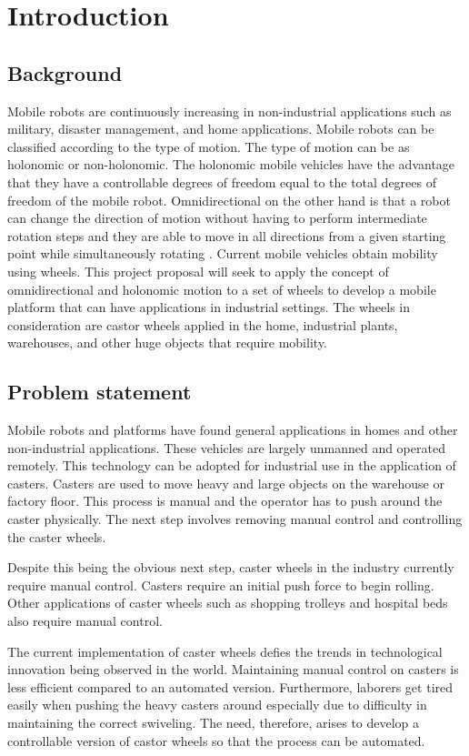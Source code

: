 \section{Introduction}
\label{sec:introduction}

\subsection{Background}

Mobile robots are continuously increasing in non-industrial applications such as military, disaster management, and home applications.
Mobile robots can be classified according to the type of motion. The type of motion can be as holonomic or non-holonomic.
The holonomic mobile vehicles have the advantage that they have a controllable degrees of freedom equal to the total degrees of freedom of the mobile robot.
Omnidirectional on the other hand is that a robot can change the direction of motion without having to perform intermediate rotation steps and they are able to move in all directions from a given starting point while simultaneously rotating \cite{javier_moreno_design_2016}.
Current mobile vehicles obtain mobility using wheels.
This project proposal will seek to apply the concept of omnidirectional and holonomic motion to a set of wheels to develop a mobile platform that can have applications in industrial settings.
The wheels in consideration are castor wheels applied in the home, industrial plants, warehouses, and other huge objects that require mobility.

\subsection{Problem statement}

Mobile robots and platforms have found general applications in homes and other non-industrial applications.
These vehicles are largely unmanned and operated remotely.
This technology can be adopted for industrial use in the application of casters.
Casters are used to move heavy and large objects on the warehouse or factory floor.
This process is manual and the operator has to push around the caster physically.
The next step involves removing manual control and controlling the caster wheels. 
\par
Despite this being the obvious next step, caster wheels in the industry currently require manual control.
Casters require an initial push force to begin rolling.
Other applications of caster wheels such as shopping trolleys and hospital beds also require manual control. 
\par
The current implementation of caster wheels defies the trends in technological innovation being observed in the world.
Maintaining manual control on casters is less efficient compared to an automated version.
Furthermore, laborers get tired easily when pushing the heavy casters around especially due to difficulty in maintaining the correct swiveling.
The need, therefore, arises to develop a controllable version of castor wheels so that the process can be automated.


